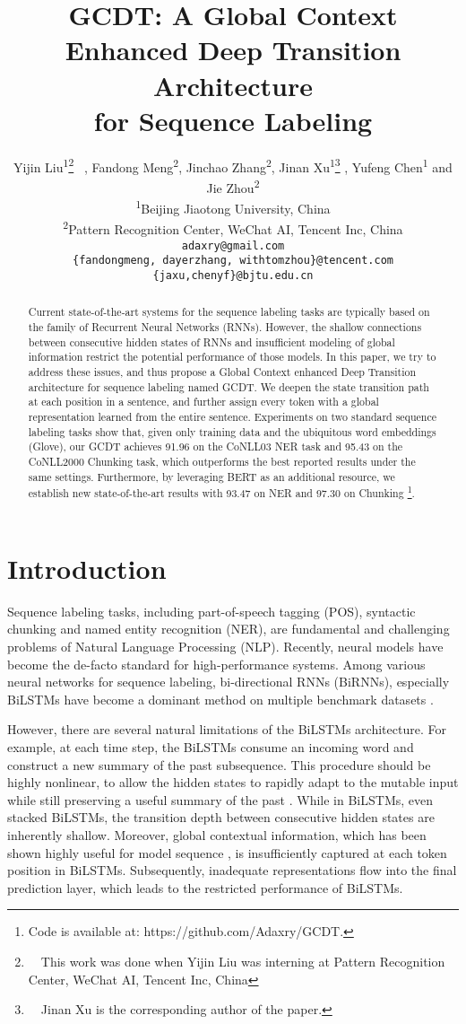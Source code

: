 \documentclass[11pt,a4paper]{article}
\title{GCDT: A Global Context Enhanced Deep Transition Architecture \\ for Sequence Labeling}
\author{
  Yijin Liu\textsuperscript{1}\thanks{\ \ This work was done when Yijin Liu was interning at Pattern Recognition Center, WeChat AI, Tencent Inc, China} \ ,
  Fandong Meng\textsuperscript{2}, 
  Jinchao Zhang\textsuperscript{2}, 
  Jinan Xu\textsuperscript{1}\thanks{ \ \ Jinan Xu is the corresponding author of the paper.} ,
  Yufeng Chen\textsuperscript{1} 
  and Jie Zhou\textsuperscript{2} \\
  \textsuperscript{1}Beijing Jiaotong University, China \\
  \textsuperscript{2}Pattern Recognition Center, WeChat AI, Tencent Inc, China \\
  \texttt{adaxry@gmail.com} \\
  \texttt{\{fandongmeng, dayerzhang, withtomzhou\}@tencent.com} \\
  \texttt{\{jaxu,chenyf\}@bjtu.edu.cn} \\
}
\date{}
\begin{document}
\maketitle
\begin{abstract}
Current state-of-the-art systems for the sequence labeling  tasks are typically based on the family of Recurrent Neural Networks (RNNs). 
However, the shallow connections between consecutive hidden states of RNNs and insufficient modeling of global information restrict the potential performance of those models. In this paper, we try to address these issues, and thus propose a Global Context enhanced Deep Transition architecture for sequence labeling named GCDT.
We deepen the state transition path at each position in a sentence, and further assign every token with a global representation learned from the entire sentence.
Experiments on two standard sequence labeling tasks show that, given only training data and the ubiquitous word embeddings (Glove), our GCDT achieves 91.96  on the CoNLL03 NER task and 95.43  on the CoNLL2000 Chunking task, which outperforms the best reported results under the same settings.
Furthermore, by leveraging BERT as an additional resource, we establish new state-of-the-art results with 93.47  on NER and 97.30  on Chunking \footnote{Code is available at:  https://github.com/Adaxry/GCDT.}. 

\end{abstract}

\section{Introduction}
Sequence labeling tasks, including part-of-speech tagging (POS), syntactic chunking and named entity recognition (NER), are fundamental and challenging problems of Natural Language Processing (NLP).
Recently, neural models have become the de-facto standard for high-performance systems. Among various neural networks for sequence labeling, bi-directional RNNs (BiRNNs), especially BiLSTMs \cite{LSTM} have become a dominant method on multiple benchmark datasets \cite{BLSTM+CRF,char-CNN+BLSTM,char-LSTM+BLSTM+CRF,Peter2017}.

However, there are several natural limitations of the BiLSTMs architecture. For example, at each time step, the BiLSTMs consume an incoming word and construct a new summary of the past subsequence. This procedure should be highly nonlinear, to allow the hidden states to rapidly adapt to the mutable input while still preserving a useful summary of the past \cite{DT_language_model}. While in BiLSTMs, even stacked BiLSTMs, the transition depth between consecutive hidden states are inherently shallow. Moreover, global contextual information, which has been shown highly useful for model sequence \cite{SLSTM}, is insufficiently captured at each token position in BiLSTMs. Subsequently, inadequate representations flow into the final prediction layer, which leads to the restricted performance of BiLSTMs.
\end{document}
